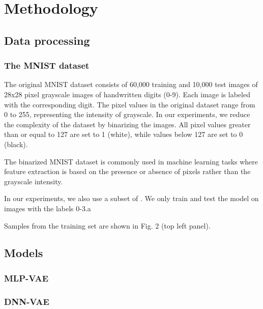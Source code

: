 \section{Methodology}\label{sec:Method}

\subsection{Data processing}
\subsubsection{The MNIST dataset}


The original MNIST dataset consists of 60,000 training and 10,000 test images of 28x28 pixel grayscale images of handwritten digits (0-9). Each image is labeled with the corresponding digit. The pixel values in the original dataset range from 0 to 255, representing the intensity of grayscale. In our experiments, we reduce the complexity of the dataset by binarizing the images. All pixel values greater than or equal to 127 are set to 1 (white), while values below 127 are set to 0 (black).

The binarized MNIST dataset is commonly used in machine learning tasks where feature extraction is based on the presence or absence of pixels rather than the grayscale intensity.

In our experiments, we also use a subset of . We only train and test the model on images with the labels 0-3.a

Samples from the training set are shown in Fig. 2 (top left panel).


\subsection{Models}
\subsubsection{MLP-VAE}

\subsubsection{DNN-VAE}

